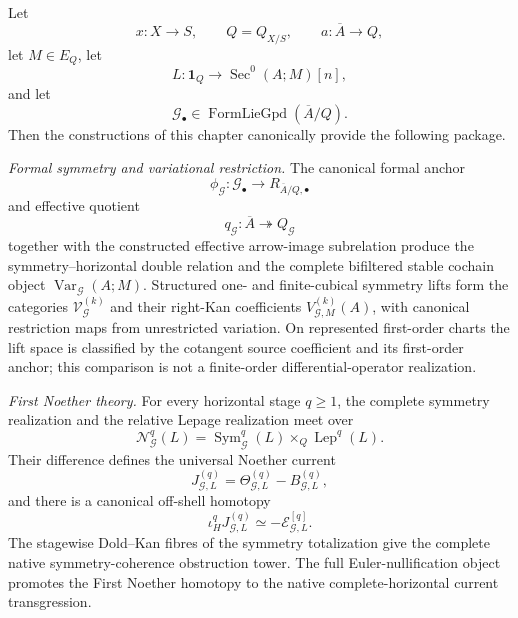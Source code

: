\begin{theorem}
\label{thm:symmetry-noether-brave-new-infinitesimal-symmetry-and-noether-package}
Let
\[
x:X\to S,\qquad Q=Q_{X/S},\qquad a:\overline A\to Q,
\]
let $M\in E_Q$, let
\[
L:\mathbf1_Q\to\operatorname{Sec}^0(A;M)[n],
\]
and let
\[
\mathcal G_\bullet\in\operatorname{FormLieGpd}(\overline A/Q).
\]
Then the constructions of this chapter canonically provide the following package.

\medskip
\noindent\emph{Formal symmetry and variational restriction.}
The canonical formal anchor
\[
\phi_{\mathcal G}:\mathcal G_\bullet\to R_{\overline A/Q,\bullet}
\]
and effective quotient
\[
q_{\mathcal G}:\overline A\twoheadrightarrow Q_{\mathcal G}
\]
together with the constructed effective arrow-image subrelation produce the
symmetry--horizontal double relation and the complete bifiltered stable
cochain object $\operatorname{Var}_{\mathcal G}(A;M)$.  Structured one- and
finite-cubical symmetry lifts form the categories
$\mathcal V_{\mathcal G}^{(k)}$ and their right-Kan coefficients
$V_{\mathcal G,M}^{(k)}(A)$, with canonical restriction maps from unrestricted
variation.  On represented first-order charts the lift space is classified by the
cotangent source coefficient and its first-order anchor; this comparison is not a
finite-order differential-operator realization.

\medskip
\noindent\emph{First Noether theory.}
For every horizontal stage $q\ge1$, the complete symmetry realization and the
relative Lepage realization meet over
\[
\mathcal N_{\mathcal G}^{q}(L)
=
\operatorname{Sym}_{\mathcal G}^{q}(L)
\times_Q
\operatorname{Lep}^{q}(L).
\]
Their difference defines the universal Noether current
\[
J_{\mathcal G,L}^{(q)}
=
\Theta_{\mathcal G,L}^{(q)}-B_{\mathcal G,L}^{(q)},
\]
and there is a canonical off-shell homotopy
\[
\boxed{
\iota_H^qJ_{\mathcal G,L}^{(q)}
\simeq
-\mathscr E_{\mathcal G,L}^{[q]}.
}
\]
The stagewise Dold--Kan fibres of the symmetry totalization give the complete native
symmetry-coherence obstruction tower.  The full Euler-nullification object promotes
the First Noether homotopy to the native complete-horizontal current transgression.


\end{theorem}
